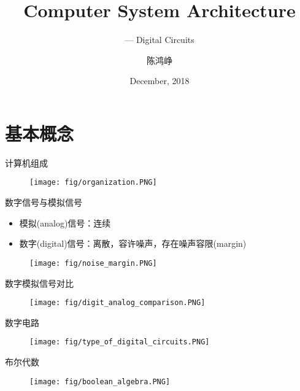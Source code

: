 \documentclass{myslide}
\title{Computer System Architecture}
\subtitle{--- Digital Circuits}
\author[chhzh123]{陈鸿峥}
\date[Dec 30, 2018]{December, 2018}
\begin{document}
\begin{frame}
\titlepage
\end{frame}

\begin{frame}
\tableofcontents[hideallsubsections]
\end{frame}

\section{基本概念}
\begin{frame}
\sectionpage
\end{frame}

\begin{frame}{计算机组成}
\begin{figure}
\centering
\texttt{[image: fig/organization.PNG]}
\end{figure}
\end{frame}

\begin{frame}{数字信号与模拟信号}
\begin{itemize}
	\item 模拟(analog)信号：连续
	\item 数字(digital)信号：离散，容许噪声，存在噪声容限(margin)
\end{itemize}
\begin{figure}
\centering
\texttt{[image: fig/noise\_margin.PNG]}
\end{figure}
\end{frame}

\begin{frame}{数字模拟信号对比}
\begin{figure}
\centering
\texttt{[image: fig/digit\_analog\_comparison.PNG]}
\end{figure}
\end{frame}

\begin{frame}{数字电路}
\begin{figure}
\centering
\texttt{[image: fig/type\_of\_digital\_circuits.PNG]}
\end{figure}
\end{frame}

\begin{frame}{布尔代数}
\begin{figure}
\centering
\texttt{[image: fig/boolean\_algebra.PNG]}
\end{figure}
\end{frame}
\end{document}
